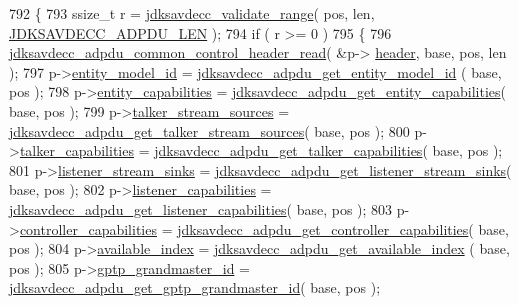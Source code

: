 \begin{DoxyCode}
792 \{
793     ssize\_t r = \hyperlink{group__util_ga9c02bdfe76c69163647c3196db7a73a1}{jdksavdecc\_validate\_range}( pos, len, 
      \hyperlink{group__adpdu_gabe529d24b7763823bb8536b1b50b2dcc}{JDKSAVDECC\_ADPDU\_LEN} );
794     \textcolor{keywordflow}{if} ( r >= 0 )
795     \{
796         \hyperlink{group__adpdu_gaa014d2ff90974366a024dac5a4f04cac}{jdksavdecc\_adpdu\_common\_control\_header\_read}( &p->
      \hyperlink{structjdksavdecc__adpdu_a250e8a37ff2e4ef65d00d9175619a72a}{header}, base, pos, len );
797         p->\hyperlink{structjdksavdecc__adpdu_a2d1d52d1ec5c6100b61acf3daa452c56}{entity\_model\_id} = \hyperlink{group__adpdu_ga25d17e8d5b3485c16ca7cba7595d2271}{jdksavdecc\_adpdu\_get\_entity\_model\_id}
      ( base, pos );
798         p->\hyperlink{structjdksavdecc__adpdu_ae3350328f131c8382ba5030939a2a484}{entity\_capabilities} = 
      \hyperlink{group__adpdu_ga5de86e90ec004ac18d45c688b2a281fe}{jdksavdecc\_adpdu\_get\_entity\_capabilities}( base, pos );
799         p->\hyperlink{structjdksavdecc__adpdu_a9bd7d7b8ebd60d782a8b2be740355a37}{talker\_stream\_sources} = 
      \hyperlink{group__adpdu_ga49981096210a18c343e4dae1f108ab28}{jdksavdecc\_adpdu\_get\_talker\_stream\_sources}( base, pos );
800         p->\hyperlink{structjdksavdecc__adpdu_a51f25c5187ed3f58d17c11e1dc0f3352}{talker\_capabilities} = 
      \hyperlink{group__adpdu_ga034c04ebeb64d4980b271fb9f9457105}{jdksavdecc\_adpdu\_get\_talker\_capabilities}( base, pos );
801         p->\hyperlink{structjdksavdecc__adpdu_aacb4d50f4068a0a36c8746e0571bf53b}{listener\_stream\_sinks} = 
      \hyperlink{group__adpdu_ga2530e19495f9c53443ddf229d6ff121f}{jdksavdecc\_adpdu\_get\_listener\_stream\_sinks}( base, pos );
802         p->\hyperlink{structjdksavdecc__adpdu_a3323f8a756edef6c94b10e2ab6c962ee}{listener\_capabilities} = 
      \hyperlink{group__adpdu_gae53a0c90e1f5cafa6639cbddacdfb180}{jdksavdecc\_adpdu\_get\_listener\_capabilities}( base, pos );
803         p->\hyperlink{structjdksavdecc__adpdu_a66f07a4a428e308f20990a0e6bbfea0c}{controller\_capabilities} = 
      \hyperlink{group__adpdu_ga6c8b9d1301ebb8e43869704497af73bc}{jdksavdecc\_adpdu\_get\_controller\_capabilities}( base, pos );
804         p->\hyperlink{structjdksavdecc__adpdu_abbe4a72641a81cba6569feb1a446d431}{available\_index} = \hyperlink{group__adpdu_ga9572ceadb76cad6c051e5ab2672553c1}{jdksavdecc\_adpdu\_get\_available\_index}
      ( base, pos );
805         p->\hyperlink{structjdksavdecc__adpdu_a34b9bb3bd1ced443f07d42e42d8e9704}{gptp\_grandmaster\_id} = 
      \hyperlink{group__adpdu_ga43b71d01d07b468523243f5a0d198094}{jdksavdecc\_adpdu\_get\_gptp\_grandmaster\_id}( base, pos );

\end{DoxyCode}
